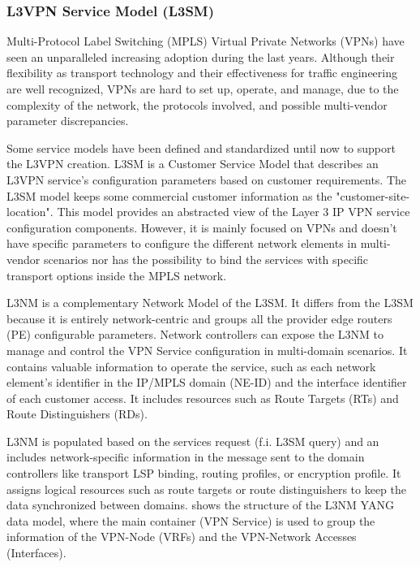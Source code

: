 \documentclass[10pt, conference]{IEEEtran}
\begin{document}
\subsubsection{L3VPN Service Model (L3SM)}
\label{section:l3nm}
Multi-Protocol Label Switching (MPLS) Virtual Private Networks (VPNs) have seen an unparalleled increasing adoption during the last years. Although their flexibility as transport technology and their effectiveness for traffic engineering are well recognized, VPNs are hard to set up, operate, and manage, due to the complexity of the network, the protocols involved, and possible multi-vendor parameter discrepancies.

Some service models have been defined and standardized until now to support the L3VPN creation. L3SM \cite{rfc8299} is a Customer Service Model that describes an L3VPN service's configuration parameters based on customer requirements. The L3SM model keeps some commercial customer information as the "customer-site-location". This model provides an abstracted view of the Layer 3 IP VPN service configuration components. However, it is mainly focused on  VPNs and doesn't have specific parameters to configure the different network elements in multi-vendor scenarios nor has the possibility to bind the services with specific transport options inside the MPLS network.  

L3NM \cite{voyer2019internet} is a complementary Network Model of the L3SM. It differs from the L3SM because it is entirely network-centric and groups all the provider edge routers (PE) configurable parameters. Network controllers can expose the L3NM to manage and control the VPN Service configuration in multi-domain scenarios. It contains valuable information to operate the service, such as each network element's identifier in the IP/MPLS domain (NE-ID) and the interface identifier of each customer access. It includes resources such as Route Targets (RTs) and Route Distinguishers (RDs).

L3NM is populated based on the services request (f.i. L3SM query) and an  includes network-specific information in the message sent to the domain controllers like transport LSP binding, routing profiles, or encryption profile. It assigns logical resources such as route targets or route distinguishers to keep the data synchronized between domains.  shows the structure of the L3NM YANG data model, where the main container (VPN Service) is used to group the information of the VPN-Node (VRFs) and the VPN-Network Accesses (Interfaces).
\end{document}
